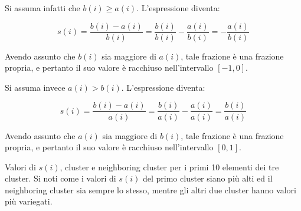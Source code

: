 \documentclass[12pt]{report}
\begin{document}
			Si assuma infatti che $b(i) \geq a(i)$. L'espressione diventa:

			\begin{equation*}
				s(i) = \frac{b(i) - a(i)}{b(i)} =
				\frac{b(i)}{b(i)} - \frac{a(i)}{b(i)} =
				- \frac{a(i)}{b(i)}
			\end{equation*}

			Avendo assunto che $b(i)$ sia maggiore di $a(i)$, tale frazione è una
			frazione propria, e pertanto il suo valore è racchiuso nell'intervallo
			$[-1, 0]$.

			Si assuma invece $a(i) > b(i)$. L'espressione diventa:

			\begin{equation*}
				s(i) = \frac{b(i) - a(i)}{a(i)} =
				\frac{b(i)}{a(i)} - \frac{a(i)}{a(i)} =
				\frac{b(i)}{a(i)}
			\end{equation*}

			Avendo assunto che $a(i)$ sia maggiore di $b(i)$, tale frazione è una
			frazione propria, e pertanto il suo valore è racchiuso nell'intervallo
			$[0, 1]$.


			\begin{table}
				\begin{boxedminipage}{0.25\linewidth}
				\end{boxedminipage}
				\begin{boxedminipage}{0.25\linewidth}
				\end{boxedminipage}
				\begin{boxedminipage}{0.25\linewidth}
				\end{boxedminipage}
				\caption{Valori di $s(i)$, cluster e neighboring cluster per
				i primi 10 elementi dei tre cluster. Si noti come i valori
				di $s(i)$ del primo cluster siano più alti ed il neighboring
				cluster sia sempre lo stesso, mentre gli altri due cluster
				hanno valori più variegati.}
				\label{tab:iris}
			\end{table}
\end{document}
